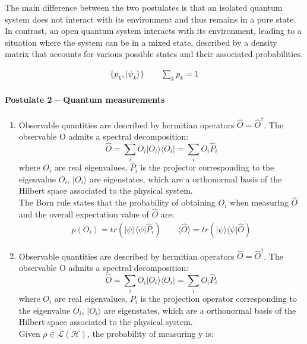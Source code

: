 The main difference between the two postulates is that an isolated quantum system does not interact with its environment and thus remains 
in a pure state. In contrast, an open quantum system interacts with its environment, leading to a situation where the system can be in a 
mixed state, described by a density matrix that accounts for various possible states and their associated probabilities.

\begin{align}
    \{p_k, |\psi_k \rangle \}
    \qquad 
    \sum_k p_k = 1
\end{align}


\paragraph{Postulate 2 – Quantum measurements}
\begin{enumerate}
    \renewcommand{\labelenumi}{I)}
    \item Observable quantities are described by hermitian operators $\hat{O} = \hat{O}^{\dagger}$.
    The observable O admits a spectral decomposition:
    \begin{equation} 
        \hat{O} = \sum_i O_i |O_i \rangle \langle O_i | = \sum_i O_i \hat{P}_i
    \end{equation} 
    where $O_i$ are real eigenvalues, $\hat{P}_i$ is the projector corresponding to the eigenvalue $O_i$, $|O_i \rangle$ are eigenstates, which are
    a orthonormal basis of the Hilbert space associated to the physical system.\\
    The Born rule states that the probability of obtaining $O_i$ when measuring $\hat{O}$ and the overall expectation value of $\hat{O}$ are:
    \begin{align}
        p(O_i) = tr(|\psi \rangle \langle \psi | \hat{P}_i) 
        \qquad
        \langle \hat{O} \rangle = tr(|\psi \rangle \langle \psi | \hat{O})
    \end{align}


    \renewcommand{\labelenumi}{O)}
    \item Observable quantities are described by hermitian operators $\hat{O} = \hat{O}^{\dagger}$.
    The observable O admits a spectral decomposition:
    \begin{equation} 
        \hat{O} = \sum_i O_i |O_i \rangle \langle O_i | = \sum_i O_i \hat{P}_i
    \end{equation} 
    where $O_i$ are real eigenvalues, $P_i$ is the projection operator corresponding to the eigenvalue $O_i$, $|O_i \rangle$ are eigenstates, which are
    a orthonormal basis of the Hilbert space associated to the physical system.\\
    Given $\rho \in \mathcal{L}(\mathcal{H})$, the probability of measuring y is:


\end{enumerate}
